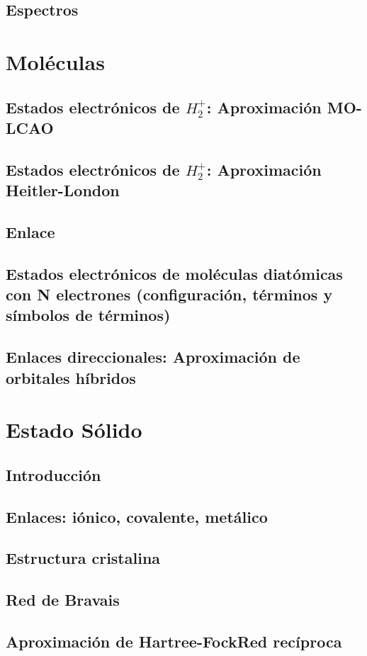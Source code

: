\documentclass[]{article}
\begin{document}
\subsection{Espectros}

\section{Moléculas}
\subsection{Estados electrónicos de $H_2^{+}$: Aproximación MO-LCAO}
\subsection{Estados electrónicos de $H_2^{+}$: Aproximación Heitler-London}
\subsection{Enlace}
\subsection{Estados electrónicos de moléculas diatómicas con N electrones (configuración, términos y símbolos de términos)}
\subsection{Enlaces direccionales: Aproximación de orbitales híbridos}
\newpage
\section{Estado Sólido}
\subsection{Introducción}
\subsection{Enlaces: iónico, covalente, metálico}
\subsection{Estructura cristalina}
\subsection{Red de Bravais}
\subsection{Aproximación de Hartree-FockRed recíproca}
\end{document}
